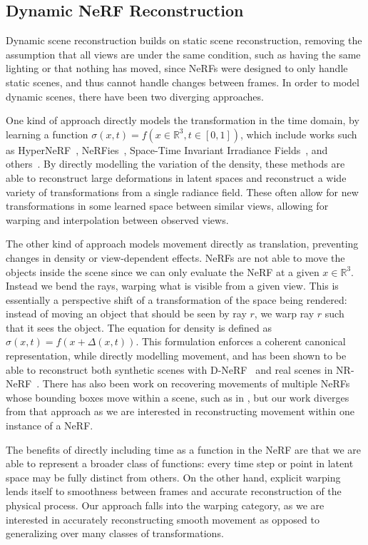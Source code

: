 \subsection*{Dynamic NeRF Reconstruction}

Dynamic scene reconstruction builds on static scene reconstruction, removing the assumption that all views are under the same condition, such as having the same lighting or that nothing has moved, since NeRFs were designed to only handle static scenes, and thus cannot handle changes between frames.
In order to model dynamic scenes, there have been two diverging approaches.

One kind of approach directly models the transformation in the time domain, by learning a function $\sigma(x,t)=f(x\in\mathbb{R}^3, t\in[0,1])$, which include works such as HyperNeRF~\cite{park2021hypernerf}, NeRFies~\cite{park2021nerfies}, Space-Time Invariant Irradiance Fields~\cite{xian2021space}, and others~\cite{Wang_2021_CVPR,du2021nerflow}. By directly modelling the variation of the density, these methods are able to reconstruct large deformations in latent spaces and reconstruct a wide variety of transformations from a single radiance field. These often allow for new transformations in some learned space between similar views, allowing for warping and interpolation between observed views.

The other kind of approach models movement directly as translation, preventing changes in density or view-dependent effects. NeRFs are not able to move the objects inside the scene since we can only evaluate the NeRF at a given $x\in\mathbb{R}^3$. Instead we bend the rays, warping what is visible from a given view. This is essentially a perspective shift of a transformation of the space being rendered: instead of moving an object that should be seen by ray $r$, we warp ray $r$ such that it sees the object. The equation for density is defined as $\sigma(x,t)=f(x+\Delta(x,t))$. This formulation enforces a coherent canonical representation, while directly modelling movement, and has been shown to be able to reconstruct both synthetic scenes with D-NeRF~\cite{pumarola2020dnerf} and real scenes in NR-NeRF~\cite{tretschk2021nonrigid}. There has also been work on recovering movements of multiple NeRFs whose bounding boxes move within a scene, such as in \cite{dynamicSceneGraphs}, but our work diverges from that approach as we are interested in reconstructing movement within one instance of a NeRF.

The benefits of directly including time as a function in the NeRF are that we are able to represent a broader class of functions: every time step or point in latent space may be fully distinct from others. On the other hand, explicit warping lends itself to smoothness between frames and accurate reconstruction of the physical process. Our approach falls into the warping category, as we are interested in accurately reconstructing smooth movement as opposed to generalizing over many classes of transformations.

